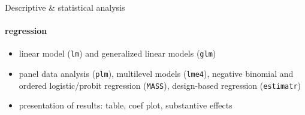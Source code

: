 \documentclass{beamer}
\begin{document}
\begin{frame}{Descriptive \& statistical analysis}
\framesubtitle{regression}
\begin{itemize}
    \item linear model (\texttt{lm}) and generalized linear models (\texttt{glm})
    \item panel data analysis (\texttt{plm}), multilevel models (\texttt{lme4}), negative binomial and ordered logistic/probit regression (\texttt{MASS}), design-based regression (\texttt{estimatr})
    \item presentation of results: table, coef plot, substantive effects
\end{itemize}
\end{frame}
    
\end{document}
